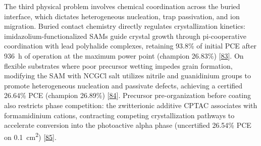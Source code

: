 \documentclass[
  11pt,
]{article}
\begin{document}
The third physical problem involves chemical coordination across the
buried interface, which dictates heterogeneous nucleation, trap
passivation, and ion migration. Buried contact chemistry directly
regulates crystallization kinetics: imidazolium-functionalized SAMs
guide crystal growth through pi-cooperative coordination with lead
polyhalide complexes, retaining 93.8\% of initial PCE after
\qty{936}{\hour} of operation at the maximum power point (champion
26.83\%) {[}\href{https://doi.org/10.1002/adma.73828}{83}{]}. On
flexible substrates where poor precursor wetting impedes grain
formation, modifying the SAM with NCGCl salt utilizes nitrile and
guanidinium groups to promote heterogeneous nucleation and passivate
defects, achieving a certified 26.64\% PCE (champion 26.89\%)
{[}\href{https://doi.org/10.1002/adma.73358}{84}{]}. Precursor
pre-organization before coating also restricts phase competition: the
zwitterionic additive CPTAC associates with formamidinium cations,
contracting competing crystallization pathways to accelerate conversion
into the photoactive alpha phase (uncertified 26.54\% PCE on
\qty{0.1}{\centi\meter\squared})
{[}\href{https://doi.org/10.1021/acsenergylett.6c01291}{85}{]}.
\end{document}
